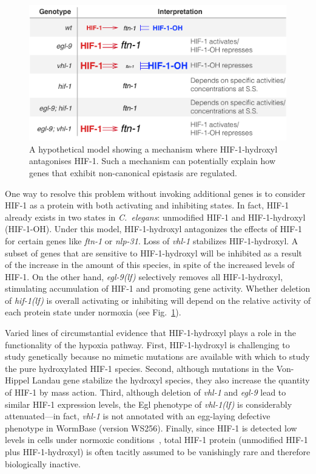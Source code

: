 \documentclass[9pt,twocolumn,twoside]{pnas-new}
\newcommand{\cel}{\emph{C.~elegans}}
\newcommand{\gene}[1]{\emph{#1}}
\newcommand{\nlp}{\emph{nlp-31}}
\newcommand{\ftna}{\emph{ftn-1}}
\newcommand{\egl}{\emph{egl-9(lf)}}
\newcommand{\vhl}{\emph{vhl-1(lf)}}
\newcommand{\hif}{\emph{hif-1(lf)}}
\newcommand{\hifp}{HIF-1}
\begin{document}
\begin{figure}[tbhp]
\centering
\includegraphics[width=\linewidth]{figs/hif1oh_model.pdf}
\caption{
A hypothetical model showing a mechanism where \hifp{}-hydroxyl antagonises
\hifp{}. Such a mechanism can potentially explain how genes that exhibit
non-canonical epistasis are regulated.
}
\label{fig:hif1oh_table}
\end{figure}

One way to resolve this problem without invoking additional genes is to
consider \hifp{} as a protein with both activating and inhibiting states. In fact,
\hifp{} already exists in two states in \cel{}: unmodified \hifp{} and
\hifp{}-hydroxyl (\hifp{}-OH). Under this model, \hifp{}-hydroxyl antagonizes
the effects of \hifp{} for certain genes like \ftna{} or \nlp{}. Loss of
\gene{vhl-1} stabilizes \hifp{}-hydroxyl.
A subset of genes that are sensitive to \hifp{}-hydroxyl will be inhibited as a
result of the increase in the amount of this species, in spite of the increased
levels of \hifp{}.
On the other hand, \egl{} selectively removes all \hifp{}-hydroxyl, stimulating
accumulation of \hifp{} and promoting gene activity. Whether deletion of \hif{}
is overall activating or inhibiting will depend on the relative activity of each
protein state under normoxia (see Fig.~\ref{fig:hif1oh_table}).

Varied lines of circumstantial evidence that \hifp{}-hydroxyl plays a role
in the functionality of the hypoxia pathway. First, \hifp{}-hydroxyl is
challenging to study genetically because no mimetic mutations are available with
which to study the pure hydroxylated \hifp{} species. Second, although mutations in
the Von-Hippel Landau gene stabilize the hydroxyl species, they also increase the
quantity of \hifp{} by mass action. Third, although deletion of \gene{vhl-1} and
\gene{egl-9} lead to similar \hifp{} expression levels, the Egl phenotype of
\vhl{} is considerably attenuated---in fact, \gene{vhl-1} is not annotated with
an egg-laying defective phenotype in WormBase (version WS256).
Finally, since \hifp{} is detected low levels
in cells under normoxic conditions~\cite{Wang1993}, total \hifp{} protein
(unmodified \hifp{} plus \hifp{}-hydroxyl) is often tacitly assumed to be
vanishingly rare and therefore biologically inactive.
\end{document}
